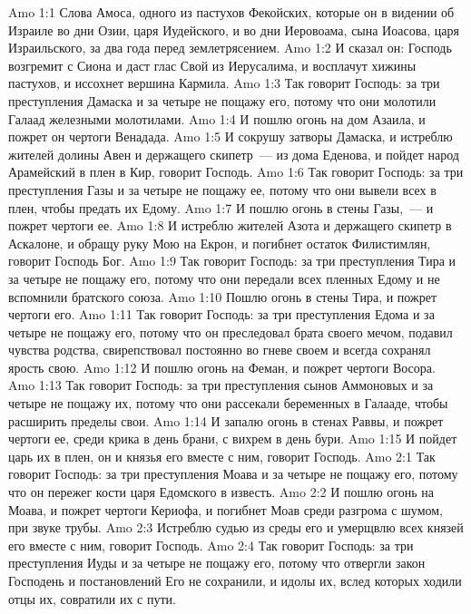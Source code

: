 \vs Amo 1:1 Слова Амоса, одного из пастухов Фекойских, которые он  в видении об Израиле во дни Озии, царя Иудейского, и во дни Иеровоама, сына Иоасова, царя Израильского, за два года перед землетрясением.
\rsbpar\vs Amo 1:2 И сказал он: Господь возгремит с Сиона и даст глас Свой из Иерусалима, и восплачут хижины пастухов, и иссохнет вершина Кармила.
\vs Amo 1:3 Так говорит Господь: за три преступления Дамаска и за четыре не пощажу его, потому что они молотили Галаад железными молотилами.
\vs Amo 1:4 И пошлю огонь на дом Азаила, и пожрет он чертоги Венадада.
\vs Amo 1:5 И сокрушу затворы Дамаска, и истреблю жителей долины Авен и держащего скипетр~--- из дома Еденова, и пойдет народ Арамейский в плен в Кир, говорит Господь.
\vs Amo 1:6 Так говорит Господь: за три преступления Газы и за четыре не пощажу ее, потому что они вывели всех в плен, чтобы предать их Едому.
\vs Amo 1:7 И пошлю огонь в стены Газы,~--- и пожрет чертоги ее.
\vs Amo 1:8 И истреблю жителей Азота и держащего скипетр в Аскалоне, и обращу руку Мою на Екрон, и погибнет остаток Филистимлян, говорит Господь Бог.
\vs Amo 1:9 Так говорит Господь: за три преступления Тира и за четыре не пощажу его, потому что они передали всех пленных Едому и не вспомнили братского союза.
\vs Amo 1:10 Пошлю огонь в стены Тира, и пожрет чертоги его.
\vs Amo 1:11 Так говорит Господь: за три преступления Едома и за четыре не пощажу его, потому что он преследовал брата своего мечом, подавил чувства родства, свирепствовал постоянно во гневе своем и всегда сохранял ярость свою.
\vs Amo 1:12 И пошлю огонь на Феман, и пожрет чертоги Восора.
\vs Amo 1:13 Так говорит Господь: за три преступления сынов Аммоновых и за четыре не пощажу их, потому что они рассекали беременных в Галааде, чтобы расширить пределы свои.
\vs Amo 1:14 И запалю огонь в стенах Раввы, и пожрет чертоги ее, среди крика в день брани, с вихрем в день бури.
\vs Amo 1:15 И пойдет царь их в плен, он и князья его вместе с ним, говорит Господь.
\vs Amo 2:1 Так говорит Господь: за три преступления Моава и за четыре не пощажу его, потому что он пережег кости царя Едомского в известь.
\vs Amo 2:2 И пошлю огонь на Моава, и пожрет чертоги Кериофа, и погибнет Моав среди разгрома с шумом, при звуке трубы.
\vs Amo 2:3 Истреблю судью из среды его и умерщвлю всех князей его вместе с ним, говорит Господь.
\vs Amo 2:4 Так говорит Господь: за три преступления Иуды и за четыре не пощажу его, потому что отвергли закон Господень и постановлений Его не сохранили, и идолы их, вслед которых ходили отцы их, совратили их с пути.
